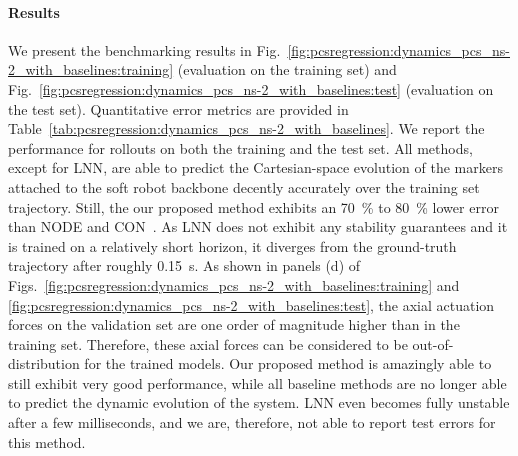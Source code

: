 \paragraph{Results}
We present the benchmarking results in Fig.~\ref{fig:pcsregression:dynamics_pcs_ns-2_with_baselines:training} (evaluation on the training set) and Fig.~\ref{fig:pcsregression:dynamics_pcs_ns-2_with_baselines:test} (evaluation on the test set). Quantitative error metrics are provided in Table~\ref{tab:pcsregression:dynamics_pcs_ns-2_with_baselines}.
We report the performance for rollouts on both the training and the test set.
All methods, except for \gls{LNN}, are able to predict the Cartesian-space evolution of the markers attached to the soft robot backbone decently accurately over the training set trajectory. Still, the our proposed method exhibits an \SI{70}{\percent} to \SI{80}{\percent} lower error than \gls{NODE} and \gls{CON}~\citep{stolzle2024input}. As \gls{LNN} does not exhibit any stability guarantees and it is trained on a relatively short horizon, it diverges from the ground-truth trajectory after roughly \SI{0.15}{s}.
As shown in panels (d) of Figs.~\ref{fig:pcsregression:dynamics_pcs_ns-2_with_baselines:training} and \ref{fig:pcsregression:dynamics_pcs_ns-2_with_baselines:test}, the axial actuation forces on the validation set are one order of magnitude higher than in the training set. Therefore, these axial forces can be considered to be out-of-distribution for the trained models. Our proposed method is amazingly able to still exhibit very good performance, while all baseline methods are no longer able to predict the dynamic evolution of the system. \gls{LNN} even becomes fully unstable after a few milliseconds, and we are, therefore, not able to report test errors for this method.

